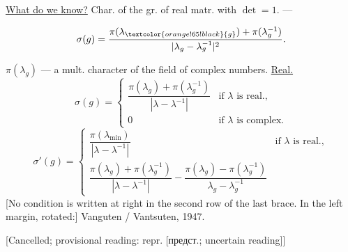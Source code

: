 \underline{What do we know?} Char. of the gr. of real matr. with $\det=1$.
 ---
\par\noindent\begin{minipage}{\linewidth}
\begin{equation*}
\sigma(g)=\frac{\pi(\lambda_{\textcolor{orange!65!black}{g}})+\pi(\lambda_g^{-1})}{|\lambda_g-\lambda_g^{-1}|^2}.
\end{equation*}
\end{minipage}\par
[At right: Gelfand, Naimark, 1947.]
$\pi(\lambda_g)$ --- a mult. character of the field of complex numbers.
\underline{Real.}
\begin{equation*}
\sigma(g)=\begin{cases}
\dfrac{\pi(\lambda_g)+\pi(\lambda_g^{-1})}{|\lambda-\lambda^{-1}|}&\text{if }\lambda\text{ is real.},\\
0&\text{if }\lambda\text{ is complex.}
\end{cases}
\end{equation*}
\begin{equation*}
\sigma'(g)=\begin{cases}
\dfrac{\pi(\lambda_{\min})}{|\lambda-\lambda^{-1}|}&\text{if }\lambda\text{ is real.},\\
\dfrac{\pi(\lambda_g)+\pi(\lambda_g^{-1})}{|\lambda-\lambda^{-1}|}
-\dfrac{\pi(\lambda_g)-\pi(\lambda_g^{-1})}{\lambda_g-\lambda_g^{-1}}&
\end{cases}
\end{equation*}
[No condition is written at right in the second row of the last brace. In the left margin, rotated:]
\textcolor{orange!65!black}{Vanguten / Vantsuten}, 1947.
\par\noindent\begin{minipage}{\linewidth}
[Cancelled; provisional reading: \textcolor{orange!65!black}{repr. [предст.; uncertain reading]}]
\end{minipage}\par
